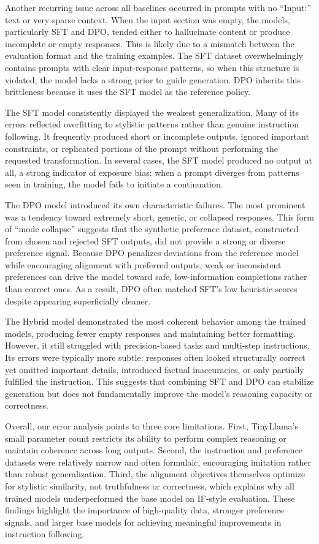 \documentclass[11pt,a4paper]{article}
\begin{document}
Another recurring issue across all baselines occurred in prompts with no ``Input:'' text or very sparse context. When the input section was empty, the models, particularly SFT and DPO, tended either to hallucinate content or produce incomplete or empty responses. This is likely due to a mismatch between the evaluation format and the training examples. The SFT dataset overwhelmingly contains prompts with clear input-response patterns, so when this structure is violated, the model lacks a strong prior to guide generation. DPO inherits this brittleness because it uses the SFT model as the reference policy.

The SFT model consistently displayed the weakest generalization. Many of its errors reflected overfitting to stylistic patterns rather than genuine instruction following. It frequently produced short or incomplete outputs, ignored important constraints, or replicated portions of the prompt without performing the requested transformation. In several cases, the SFT model produced no output at all, a strong indicator of exposure bias: when a prompt diverges from patterns seen in training, the model fails to initiate a continuation.

The DPO model introduced its own characteristic failures. The most prominent was a tendency toward extremely short, generic, or collapsed responses. This form of ``mode collapse'' suggests that the synthetic preference dataset, constructed from chosen and rejected SFT outputs, did not provide a strong or diverse preference signal. Because DPO penalizes deviations from the reference model while encouraging alignment with preferred outputs, weak or inconsistent preferences can drive the model toward safe, low-information completions rather than correct ones. As a result, DPO often matched SFT's low heuristic scores despite appearing superficially cleaner.

The Hybrid model demonstrated the most coherent behavior among the trained models, producing fewer empty responses and maintaining better formatting. However, it still struggled with precision-based tasks and multi-step instructions. Its errors were typically more subtle: responses often looked structurally correct yet omitted important details, introduced factual inaccuracies, or only partially fulfilled the instruction. This suggests that combining SFT and DPO can stabilize generation but does not fundamentally improve the model's reasoning capacity or correctness.

Overall, our error analysis points to three core limitations. First, TinyLlama's small parameter count restricts its ability to perform complex reasoning or maintain coherence across long outputs. Second, the instruction and preference datasets were relatively narrow and often formulaic, encouraging imitation rather than robust generalization. Third, the alignment objectives themselves optimize for stylistic similarity, not truthfulness or correctness, which explains why all trained models underperformed the base model on IF-style evaluation. These findings highlight the importance of high-quality data, stronger preference signals, and larger base models for achieving meaningful improvements in instruction following.
\end{document}
